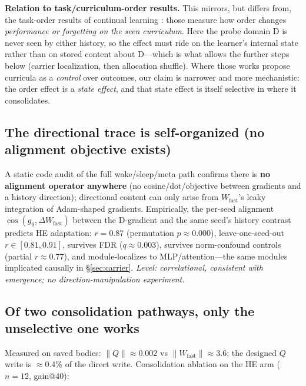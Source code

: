 \documentclass{article} %
\begin{document}
\textbf{Relation to task/curriculum-order results.} This mirrors, but differs from, the task-order results of continual learning \citep{bell2022effect, li2025optimal, poirier2005effect}: those measure how order changes \emph{performance or forgetting on the seen curriculum}. Here the probe domain D is never seen by either history, so the effect must ride on the learner's internal state rather than on stored content about D---which is what allows the further steps below (carrier localization, then allocation shuffle). Where those works propose curricula as a \emph{control} over outcomes, our claim is narrower and more mechanistic: the order effect is a \emph{state effect}, and that state effect is itself selective in where it consolidates.

\subsection{The directional trace is self-organized (no alignment objective exists)}
\label{sec:selforg}

A static code audit of the full wake/sleep/meta path confirms there is \textbf{no alignment operator anywhere} (no cosine/dot/objective between gradients and a history direction); directional content can only arise from $W_{\mathrm{fast}}$'s leaky integration of Adam-shaped gradients. Empirically, the per-seed alignment $\cos(g_0, \Delta W_{\mathrm{fast}})$ between the D-gradient and the same seed's history contrast predicts HE adaptation: $r{=}0.87$ (permutation $p\approx0.000$), leave-one-seed-out $r\in[0.81,0.91]$, survives FDR ($q\approx0.003$), survives norm-confound controls (partial $r\approx0.77$), and module-localizes to MLP/attention---the same modules implicated causally in \S\ref{sec:carrier}. \emph{Level: correlational, consistent with emergence; no direction-manipulation experiment.}

\subsection{Of two consolidation pathways, only the unselective one works}
\label{sec:pathways}

Measured on saved bodies: $\|Q\| \approx 0.002$ vs $\|W_{\mathrm{fast}}\| \approx 3.6$; the designed $Q$ write is $\approx$0.4\% of the direct write. Consolidation ablation on the HE arm ($n{=}12$, gain@40):
\end{document}
